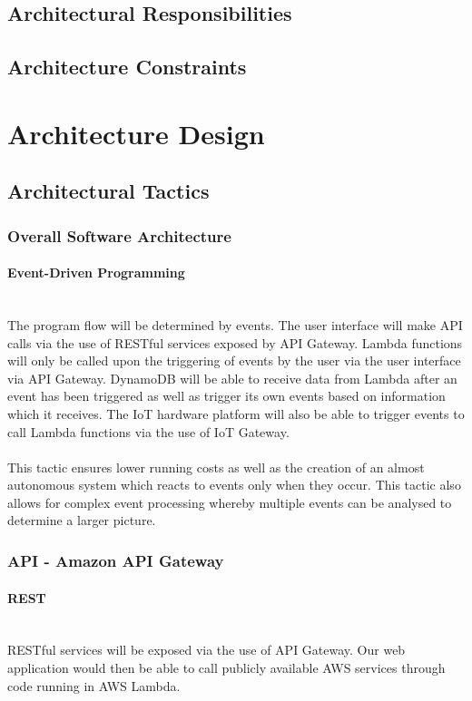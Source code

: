 \documentclass{article}
\begin{document}
\subsection{Architectural Responsibilities}
\subsection{Architecture Constraints}

\cleardoublepage

\section{Architecture Design}
\subsection{Architectural Tactics}
	\subsubsection{Overall Software Architecture}
		\paragraph{Event-Driven Programming}\mbox{}\\
		The program flow will be determined by events. The user interface will make API calls via the use of RESTful services exposed by API Gateway. Lambda functions will only be called upon the triggering of events by the user via the user interface via API Gateway. DynamoDB will be able to receive data from Lambda after an event has been triggered as well as trigger its own events based on information which it receives. The IoT hardware platform will also be able to trigger events to call Lambda functions via the use of IoT Gateway.\\\\
		This tactic ensures lower running costs as well as the creation of an almost autonomous system which reacts to events only when they occur. This tactic also allows for complex event processing whereby multiple events can be analysed to determine a larger picture.
	\subsubsection{API - Amazon API Gateway}
		\paragraph{REST}\mbox{}\\
		RESTful services will be exposed via the use of API Gateway. Our web application would then be able to call publicly available AWS services through code running in AWS Lambda.
\end{document}
